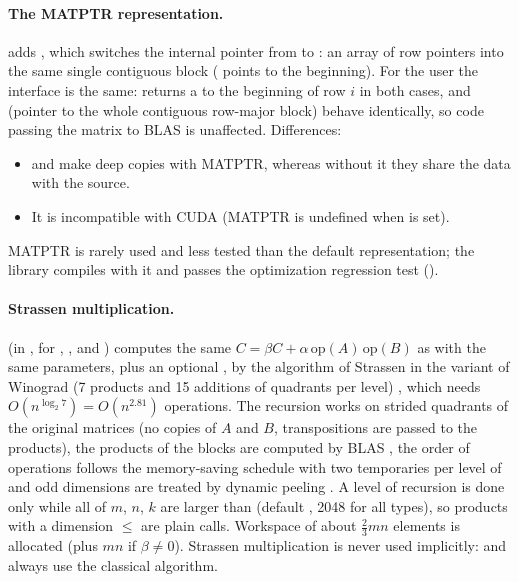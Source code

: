 \paragraph{The MATPTR representation.}\label{sec:mat:matptr}
 adds , which switches the internal pointer from
 to : an array of row pointers into the same single contiguous block
( points to the beginning). For the user the interface is the same: 
returns a  to the beginning of row $i$ in both cases,  and
 (pointer to the whole contiguous row-major block) behave identically,
so code passing the matrix to BLAS is unaffected. Differences:
\begin{itemize}
\item {} and  make deep
copies with MATPTR, whereas without it they share the data with the source.
\item It is incompatible with CUDA (MATPTR is undefined when  is set).
\end{itemize}
MATPTR is rarely used and less tested than the default representation; the library compiles with it and passes the optimization
regression test ().

\paragraph{Strassen multiplication.}\label{sec:mat:strassen}
 (in , for , ,  and ) computes the
same $C=\beta C+\alpha\,\mathrm{op}(A)\,\mathrm{op}(B)$ as  with the same parameters, plus an optional , by the
algorithm of Strassen \cite{mat:strassen1969} in the variant of Winograd (7 products and 15 additions of quadrants per level)
\cite{mat:winograd1971}, which needs $O(n^{\log_2 7})=O(n^{2.81})$ operations. The recursion works on strided quadrants of the original
matrices (no copies of $A$ and $B$, transpositions are passed to the products), the products of the blocks are computed by BLAS
, the order of operations follows the memory-saving schedule with two temporaries per level of \cite{mat:boyer2009} and odd
dimensions are treated by dynamic peeling \cite{mat:husslederman1996}. A level of recursion is done only while all of $m$, $n$, $k$ are larger
than  (default , 2048 for all types), so products with a dimension $\le$
 are plain  calls. Workspace of about $\frac23 mn$ elements is allocated (plus $mn$ if $\beta\ne0$).
Strassen multiplication is never used implicitly:  and  always use the classical algorithm.

